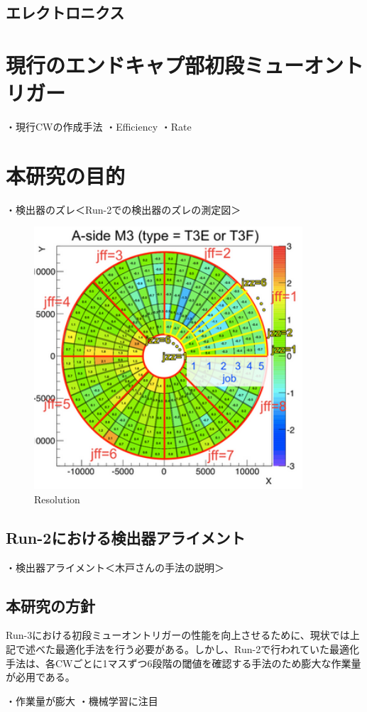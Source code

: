 \subsection{エレクトロニクス}



\section{現行のエンドキャプ部初段ミューオントリガー}
・現行CWの作成手法
・Efficiency
・Rate

\section{本研究の目的}
・検出器のズレ＜Run-2での検出器のズレの測定図＞
\begin{figure}[tb]
  \centering
  \includegraphics[clip, width=10cm]{fig/4/zure.png}
  \caption{Resolution}
  \label{fig:Resolution}
\end{figure}

\subsection{Run-2における検出器アライメント}
・検出器アライメント＜木戸さんの手法の説明＞
\subsection{本研究の方針}
Run-3における初段ミューオントリガーの性能を向上させるために、現状では上記で述べた最適化手法を行う必要がある。しかし、Run-2で行われていた最適化手法は、各CWごとに1マスずつ6段階の閾値を確認する手法のため膨大な作業量が必用である。

・作業量が膨大
・機械学習に注目














